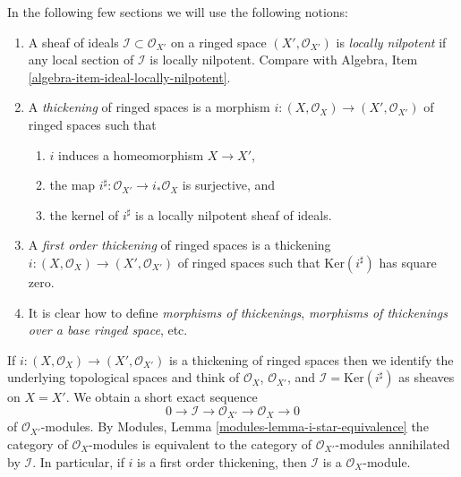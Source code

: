 \noindent
In the following few sections we will use the following notions:
\begin{enumerate}
\item A sheaf of ideals $\mathcal{I} \subset \mathcal{O}_{X'}$ on
a ringed space $(X', \mathcal{O}_{X'})$ is {\it locally nilpotent}
if any local section of $\mathcal{I}$ is locally nilpotent.
Compare with Algebra, Item \ref{algebra-item-ideal-locally-nilpotent}.
\item A {\it thickening} of ringed spaces is a morphism
$i : (X, \mathcal{O}_X) \to (X', \mathcal{O}_{X'})$ of ringed spaces
such that
\begin{enumerate}
\item $i$ induces a homeomorphism $X \to X'$,
\item the map $i^\sharp : \mathcal{O}_{X'} \to i_*\mathcal{O}_X$
is surjective, and
\item the kernel of $i^\sharp$ is a locally nilpotent sheaf of ideals.
\end{enumerate}
\item A {\it first order thickening} of ringed spaces is a thickening
$i : (X, \mathcal{O}_X) \to (X', \mathcal{O}_{X'})$ of ringed spaces
such that $\text{Ker}(i^\sharp)$ has square zero.
\item It is clear how to define {\it morphisms of thickenings},
{\it morphisms of thickenings over a base ringed space}, etc.
\end{enumerate}
If $i : (X, \mathcal{O}_X) \to (X', \mathcal{O}_{X'})$ is a thickening
of ringed spaces then we identify the underlying topological spaces
and think of $\mathcal{O}_X$, $\mathcal{O}_{X'}$, and
$\mathcal{I} = \text{Ker}(i^\sharp)$ as sheaves on $X = X'$. We obtain
a short exact sequence
$$
0 \to \mathcal{I} \to \mathcal{O}_{X'} \to \mathcal{O}_X \to 0
$$
of $\mathcal{O}_{X'}$-modules. By
Modules, Lemma \ref{modules-lemma-i-star-equivalence}
the category of $\mathcal{O}_X$-modules is equivalent to the category
of $\mathcal{O}_{X'}$-modules annihilated by $\mathcal{I}$. In particular,
if $i$ is a first order thickening, then
$\mathcal{I}$ is a $\mathcal{O}_X$-module.

